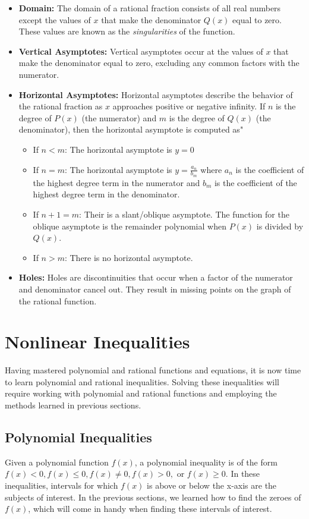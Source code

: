\documentclass[11pt]{article}
\begin{document}
\begin{itemize}
  \item \textbf{Domain:} The domain of a rational fraction consists of all real numbers except the values of $x$ that make the denominator $Q(x)$ equal to zero. These values are known as the \textit{singularities} of the function.
  \item \textbf{Vertical Asymptotes:} Vertical asymptotes occur at the values of $x$ that make the denominator equal to zero, excluding any common factors with the numerator. 
  \item \textbf{Horizontal Asymptotes:} Horizontal asymptotes describe the behavior of the rational fraction as $x$ approaches positive or negative infinity. If $n$ is the degree of $P(x)$ (the numerator) and $m$ is the degree of $Q(x)$ (the denominator), then the horizontal asymptote is computed as"
  \begin{itemize}
      \item If $n < m$: The horizontal asymptote is $y = 0$
      \item If $n = m$: The horizontal asymptote is $y = \frac{a_{n}}{b_{m}}$ where $a_{n}$ is the coefficient of the highest degree term in the numerator and $b_{m}$ is the coefficient of the highest degree term in the denominator.
      \item If $n + 1 = m $: Their is a slant/oblique asymptote. The function for the oblique asymptote is the remainder polynomial when $P(x)$ is divided by $Q(x)$.
      \item If $n > m$: There is no horizontal asymptote.
  \end{itemize}
  \item \textbf{Holes:} Holes are discontinuities that occur when a factor of the numerator and denominator cancel out. They result in missing points on the graph of the rational function.
\end{itemize}

\section{Nonlinear Inequalities}
Having mastered polynomial and rational functions and equations, it is now time to learn polynomial and rational inequalities. Solving these inequalities will require working with polynomial and rational functions and employing the methods learned in previous sections.

\subsection{Polynomial Inequalities}
Given a polynomial function $f(x)$, a polynomial inequality is of the form $f(x)<0, f(x)\leq 0, f(x)\neq 0, f(x)>0, $ or $f(x)\geq 0$. In these inequalities, intervals for which $f(x)$ is above or below the x-axis are the subjects of interest. In the previous sections, we learned how to find the zeroes of $f(x)$, which will come in handy when finding these intervals of interest. 
\end{document}
